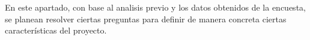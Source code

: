 \tab En este apartado, con base al analisis previo y los datos obtenidos de la encuesta, se planean resolver ciertas preguntas para definir de manera concreta ciertas características del proyecto.